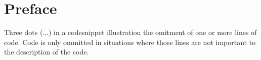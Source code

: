 \chapter*{Preface}
\label{chap:preface}

Three dots (...) in a codesnippet illustration the omitment of one or more lines of code. 
Code is only ommitted in situations where those lines are not important to the description of the code. 


